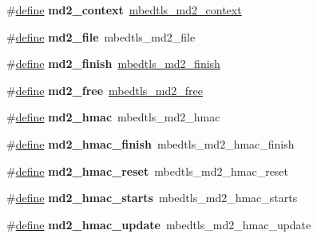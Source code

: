 \begin{DoxyCompactItemize}
\#\hyperlink{structdefine}{define} {\bfseries md2\+\_\+context}~\hyperlink{structmbedtls__md2__context}{mbedtls\+\_\+md2\+\_\+context}
\item 
\mbox{\label{compat-1_83_8h_a0cca03b008b46c1dec3be0907be19846}} 
\#\hyperlink{structdefine}{define} {\bfseries md2\+\_\+file}~mbedtls\+\_\+md2\+\_\+file
\item 
\mbox{\label{compat-1_83_8h_aa77d421be10638f698b88b6d27754804}} 
\#\hyperlink{structdefine}{define} {\bfseries md2\+\_\+finish}~\hyperlink{md2_8h_a0774dfae35c9040ba19ee2213a59935e}{mbedtls\+\_\+md2\+\_\+finish}
\item 
\mbox{\label{compat-1_83_8h_ae7ea8622247f2a7a81d49d0de0e7bc89}} 
\#\hyperlink{structdefine}{define} {\bfseries md2\+\_\+free}~\hyperlink{md2_8h_aa4e7e7bee8322a4409c1d562a9b5efa4}{mbedtls\+\_\+md2\+\_\+free}
\item 
\mbox{\label{compat-1_83_8h_a3b6d6bdbf887b0ab7a3a9806f0aaa17a}} 
\#\hyperlink{structdefine}{define} {\bfseries md2\+\_\+hmac}~mbedtls\+\_\+md2\+\_\+hmac
\item 
\mbox{\label{compat-1_83_8h_a6e0b9328a1b0a5ca795c096a113e4a61}} 
\#\hyperlink{structdefine}{define} {\bfseries md2\+\_\+hmac\+\_\+finish}~mbedtls\+\_\+md2\+\_\+hmac\+\_\+finish
\item 
\mbox{\label{compat-1_83_8h_aba97d06fc166c851a7d311652919fb74}} 
\#\hyperlink{structdefine}{define} {\bfseries md2\+\_\+hmac\+\_\+reset}~mbedtls\+\_\+md2\+\_\+hmac\+\_\+reset
\item 
\mbox{\label{compat-1_83_8h_ae819ec69e6596e19736b47d1b8f9544e}} 
\#\hyperlink{structdefine}{define} {\bfseries md2\+\_\+hmac\+\_\+starts}~mbedtls\+\_\+md2\+\_\+hmac\+\_\+starts
\item 
\mbox{\label{compat-1_83_8h_a5275fa7ec03eaa0645549de47c87a31d}} 
\#\hyperlink{structdefine}{define} {\bfseries md2\+\_\+hmac\+\_\+update}~mbedtls\+\_\+md2\+\_\+hmac\+\_\+update
\item 
\mbox{\label{compat-1_83_8h_a5d3d2f9df50a2b1f9fe1dcaf838980ff}} 

\end{DoxyCompactItemize}
